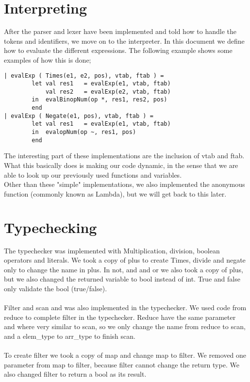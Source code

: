 \documentclass[12pt]{article}
\begin{document}
\section{Interpreting}
After the parser and lexer have been implemented and told how to handle the tokens and identifiers, we move on to the interpreter. In this document we define how to evaluate the different expressions. The following example shows some examples of how this is done;\\
\begin{verbatim}
| evalExp ( Times(e1, e2, pos), vtab, ftab ) =
        let val res1   = evalExp(e1, vtab, ftab)
            val res2   = evalExp(e2, vtab, ftab)
        in  evalBinopNum(op *, res1, res2, pos)
        end
| evalExp ( Negate(e1, pos), vtab, ftab ) =
        let val res1   = evalExp(e1, vtab, ftab)
        in  evalopNum(op ~, res1, pos)
        end
\end{verbatim}
The interesting part of these implementations are the inclusion of vtab and ftab. What this basically does is making our code dynamic, in the sense that we are able to look up our previously used functions and variables.\\
Other than these "simple" implementations, we also implemented the anonymous function (commonly known as Lambda), but we will get back to this later.
\section{Typechecking}
The typechecker was implemented with Multiplication, division, boolean operators and literals. We took a copy of plus to create Times, divide and negate only to change the name in plus. In not, and and or we also took a copy of plus, but we also changed the returned variable to bool instead of int. True and false only validate the bool (true/false).
\\\\
Filter and scan and was also implemented in the typechecker. We used code from reduce to complete filter in the typechecker. Reduce have the same parameter and where very similar to scan, so we only change the name from reduce to scan, and a elem\_type to arr\_type to finish scan.
\\\\
To create filter we took a copy of map and change map to filter. We removed one parameter from map to filter, because filter cannot change the return type. We also changed filter to return a bool as its result.
\end{document}
